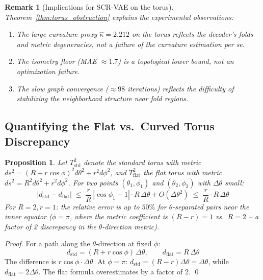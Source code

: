 \documentclass{article}
\newtheorem{proposition}{Proposition}
\newtheorem{remark}{Remark}
\begin{document}
\begin{remark}[Implications for SCR-VAE on the torus]
Theorem~\ref{thm:torus_obstruction} explains the experimental observations:
\begin{enumerate}
  \item The large curvature proxy $\hat{\kappa} = 2.212$ on the torus
    reflects the decoder's folds and metric degeneracies, not a failure of the
    curvature estimation per se.
  \item The isometry floor (MAE $\approx 1.7$) is a topological lower bound,
    not an optimization failure.
  \item The slow graph convergence ($\approx 98$ iterations) reflects the
    difficulty of stabilizing the neighborhood structure near fold regions.
\end{enumerate}
\end{remark}

\subsection{Quantifying the Flat vs.\ Curved Torus Discrepancy}
\label{sec:bridge_torus_metric}

\begin{proofbox}
\begin{proposition}
\label{prop:torus_metric_error}
Let $T^2_{\text{std}}$ denote the standard torus with metric
$ds^2 = (R + r\cos\phi)^2 d\theta^2 + r^2 d\phi^2$, and $T^2_{\text{flat}}$
the flat torus with metric $ds^2 = R^2 d\theta^2 + r^2 d\phi^2$.
For two points $(\theta_1, \phi_1)$ and $(\theta_2, \phi_2)$ with
$\Delta\theta$ small:
\[
  \left|d_{\text{std}} - d_{\text{flat}}\right|
  \;\leq\; \frac{r}{R}\,|\cos\phi_1 - 1| \cdot R\,\Delta\theta + O(\Delta\theta^2)
  \;\leq\; \frac{r}{R} \cdot R\,\Delta\theta
\]
For $R = 2, r = 1$: the relative error is up to $50\%$ for $\theta$-separated
pairs near the inner equator ($\phi = \pi$, where the metric coefficient is
$(R - r) = 1$ vs.\ $R = 2$ -- a factor of 2 discrepancy in the $\theta$-direction
metric).
\end{proposition}

\begin{proof}
For a path along the $\theta$-direction at fixed $\phi$:
\[
  d_{\text{std}} = (R + r\cos\phi)\,\Delta\theta, \qquad
  d_{\text{flat}} = R\,\Delta\theta
\]
The difference is $r\cos\phi \cdot \Delta\theta$. At $\phi = \pi$:
$d_{\text{std}} = (R - r)\Delta\theta = \Delta\theta$, while
$d_{\text{flat}} = 2\Delta\theta$. The flat formula overestimates by a
factor of 2. \qed
\end{proof}
\end{proofbox}
\end{document}
